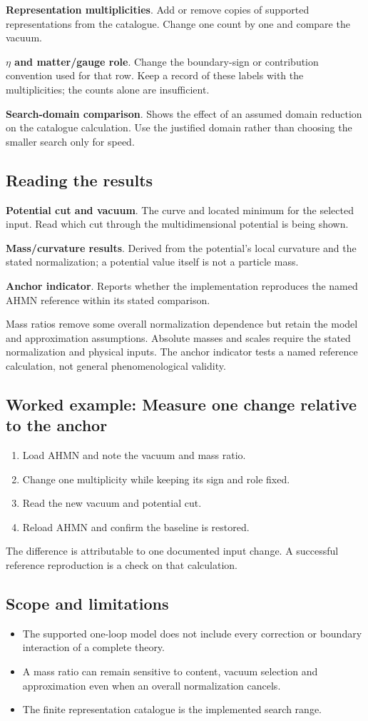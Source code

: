 \documentclass[11pt,a4paper]{article}
\begin{document}
\textbf{Representation multiplicities}. Add or remove copies of supported representations from the catalogue. Change one count by one and compare the vacuum.

\textbf{\ensuremath{\eta} and matter/gauge role}. Change the boundary-sign or contribution convention used for that row. Keep a record of these labels with the multiplicities; the counts alone are insufficient.

\textbf{Search-domain comparison}. Shows the effect of an assumed domain reduction on the catalogue calculation. Use the justified domain rather than choosing the smaller search only for speed.

\subsection*{Reading the results}
\textbf{Potential cut and vacuum}. The curve and located minimum for the selected input. Read which cut through the multidimensional potential is being shown.

\textbf{Mass/curvature results}. Derived from the potential's local curvature and the stated normalization; a potential value itself is not a particle mass.

\textbf{Anchor indicator}. Reports whether the implementation reproduces the named AHMN reference within its stated comparison.

Mass ratios remove some overall normalization dependence but retain the model and approximation assumptions. Absolute masses and scales require the stated normalization and physical inputs. The anchor indicator tests a named reference calculation, not general phenomenological validity.
\subsection*{Worked example: Measure one change relative to the anchor}
\begin{enumerate}
\item Load AHMN and note the vacuum and mass ratio.
\item Change one multiplicity while keeping its sign and role fixed.
\item Read the new vacuum and potential cut.
\item Reload AHMN and confirm the baseline is restored.
\end{enumerate}
The difference is attributable to one documented input change. A successful reference reproduction is a check on that calculation.
\subsection*{Scope and limitations}
\begin{itemize}
\item The supported one-loop model does not include every correction or boundary interaction of a complete theory.
\item A mass ratio can remain sensitive to content, vacuum selection and approximation even when an overall normalization cancels.
\item The finite representation catalogue is the implemented search range.
\end{itemize}
\end{document}
